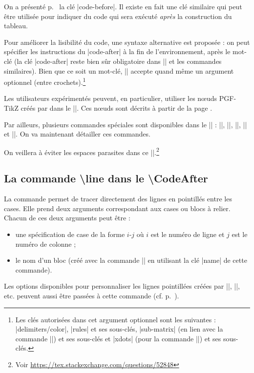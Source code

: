 \documentclass[dvipsnames]{article}%
\begin{document}

\label{code-after}
On a présenté p.~\pageref{code-before} la clé |code-before|. Il existe en fait
une clé similaire  qui peut être utilisée pour indiquer
du code qui sera exécuté \emph{après} la construction du tableau.

\medskip
{}
Pour améliorer la lisibilité du code, une syntaxe alternative est proposée : on
peut spécifier les instructions du |code-after| à la fin de l'environnement,
après le mot-clé  (la clé |code-after| reste bien
sûr obligatoire dans |\AutoNiceMatrix| et les commandes similaires). Bien que ce
soit un mot-clé, |\CodeAfter| accepte quand même un argument optionnel (entre
crochets).\footnote{Les clés autorisées dans cet argument optionnel sont les
  suivantes : |delimiters/color|, |rules| et ses sous-clés, |sub-matrix| (en
  lien avec la commande |\SubMatrix|) et ses sous-clés et |xdots| (pour la
  commande |\line|) et ses sous-clés.} 


\medskip
Les utilisateurs expérimentés peuvent, en particulier, utiliser les nœuds
PGF-TikZ créés par  dans le |\CodeAfter|. Ces nœuds sont décrits
à partir de la page \pageref{PGF-nodes}.

\medskip
Par ailleurs, plusieurs commandes spéciales sont disponibles dans le
|\CodeAfter| : |\line|, |\SubMatrix|, |\OverBrace|, |\UnderBrace| et
|\TikzEveryCell|. On va maintenant détailler ces commandes.

\medskip
On veillera à éviter les espaces parasites dans ce |\CodeAfter|.\footnote{Voir
  \url{https://tex.stackexchange.com/questions/52848}} 

\subsection{La commande \textbackslash line dans le \textbackslash CodeAfter}

\label{line-in-code-after}
La commande  permet de tracer directement des lignes en
pointillés entre les cases. Elle prend deux arguments correspondant aux cases ou
blocs à relier. Chacun de ces deux arguments peut être :
\begin{itemize}
\item une spécification de case de la forme $i$-$j$ où $i$ est le numéro de
ligne et $j$ est le numéro de colonne ; 
\item le nom d'un bloc (créé avec la commande |\Block| en utilisant la clé
|name| de cette commande).
\end{itemize}
 Les options disponibles pour personnaliser les lignes pointillées créées par
|\Cdots|, |\Vdots|, etc. peuvent aussi être passées à cette commande (cf.
p.~\pageref{customization}).
\end{document}
